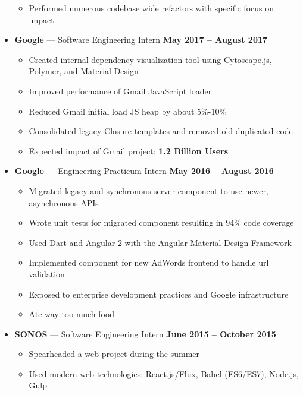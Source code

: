 \documentclass[10pt, oneside]{letter}
\newcommand{\textapprox}{\raisebox{0.5ex}{\texttildelow}}
\begin{document}
\begin{adjustwidth}{0.1in}{0pt}
\begin{itemize}
\begin{itemize}
            \item{Performed numerous codebase wide refactors with specific focus on impact}
            \end{itemize}
        \item
          \textbf{Google} --- Software Engineering Intern \hfill \textbf{May 2017 -- August 2017}
            \begin{itemize}
              \item Created internal dependency visualization tool using Cytoscape.js, Polymer, and Material Design
              \item Improved performance of Gmail JavaScript loader
              \item Reduced Gmail initial load JS heap by about 5\%-10\%
              \item Consolidated legacy Closure templates and removed old duplicated code
              \item Expected impact of Gmail project: \textbf{\textapprox 1.2 Billion Users}
            \end{itemize}
        \item
          \textbf{Google} --- Engineering Practicum Intern \hfill \textbf{May 2016 -- August 2016}
            \begin{itemize}
              \item Migrated legacy and synchronous server component to use newer, asynchronous APIs
              \item Wrote unit tests for migrated component resulting in 94\% code coverage
              \item Used Dart and Angular 2 with the Angular Material Design Framework
              \item Implemented component for new AdWords frontend to handle url validation
              \item Exposed to enterprise development practices and Google infrastructure
              \item Ate way too much food
            \end{itemize}
        \item
          \textbf{SONOS} --- Software Engineering Intern \hfill \textbf{June 2015 -- October 2015}
            \begin{itemize}
              \item Spearheaded a web project during the summer
              \item Used modern web technologies: React.js/Flux, Babel (ES6/ES7), Node.js, Gulp

\end{itemize}
\end{itemize}
\end{adjustwidth}
\end{document}
